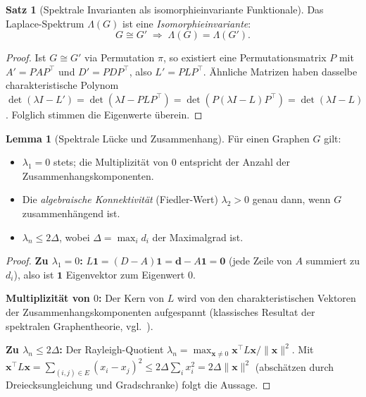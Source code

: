 ﻿\documentclass[a4paper,12pt]{article}
\theoremstyle{definition}
\newtheorem{satz}{Satz}
\newtheorem{lemma}{Lemma}
\begin{document}
\begin{satz}[Spektrale Invarianten als isomorphieinvariante Funktionale]
\label{satz:spek}
    Das Laplace-Spektrum $\Lambda(G)$ ist eine \emph{Isomorphieinvariante}:
    \[
    G \cong G' \;\Longrightarrow\; \Lambda(G) = \Lambda(G').
    \]
\end{satz}

\begin{proof}
    Ist $G \cong G'$ via Permutation $\pi$, so existiert eine Permutationsmatrix $P$ mit
    $A' = P A P^\top$ und $D' = P D P^\top$, also $L' = P L P^\top$.
    Ähnliche Matrizen haben dasselbe charakteristische Polynom $\det(\lambda I - L') =
    \det(\lambda I - PLP^\top) = \det(P(\lambda I - L)P^\top) = \det(\lambda I - L)$.
    Folglich stimmen die Eigenwerte überein. \qedhere
\end{proof}

\begin{lemma}[Spektrale Lücke und Zusammenhang]
\label{lem:gap}
    Für einen Graphen $G$ gilt:
    \begin{itemize}
        \item $\lambda_1 = 0$ stets; die Multiplizität von $0$ entspricht der Anzahl der
              Zusammenhangskomponenten.
        \item Die \emph{algebraische Konnektivität} (Fiedler-Wert) $\lambda_2 > 0$
              genau dann, wenn $G$ zusammenhängend ist.
        \item $\lambda_n \leq 2\Delta$, wobei $\Delta = \max_i d_i$ der Maximalgrad ist.
    \end{itemize}
\end{lemma}

\begin{proof}
    \textbf{Zu $\lambda_1=0$:} $L\mathbf{1} = (D-A)\mathbf{1} = \mathbf{d} - A\mathbf{1} = \mathbf{0}$
    (jede Zeile von $A$ summiert zu $d_i$), also ist $\mathbf{1}$ Eigenvektor zum Eigenwert $0$.

    \textbf{Multiplizität von $0$:} Der Kern von $L$ wird von den charakteristischen
    Vektoren der Zusammenhangskomponenten aufgespannt (klassisches Resultat der spektralen
    Graphentheorie, vgl.~\cite{mohar1991}).

    \textbf{Zu $\lambda_n \leq 2\Delta$:} Der Rayleigh-Quotient
    $\lambda_n = \max_{\mathbf{x}\neq 0} \mathbf{x}^\top L \mathbf{x}/\|\mathbf{x}\|^2$.
    Mit $\mathbf{x}^\top L \mathbf{x} = \sum_{(i,j)\in E}(x_i - x_j)^2 \leq
    2\Delta \sum_i x_i^2 = 2\Delta \|\mathbf{x}\|^2$ (abschätzen durch Dreiecksungleichung
    und Gradschranke) folgt die Aussage. \qedhere
\end{proof}
\end{document}

